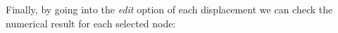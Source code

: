 Finally, by going into the \emph{edit} option of each displacement we can check the numerical result for each selected node:
\begin{figure}[H]
    \centering
    \quad
    \subfloat{
}
\end{figure}
